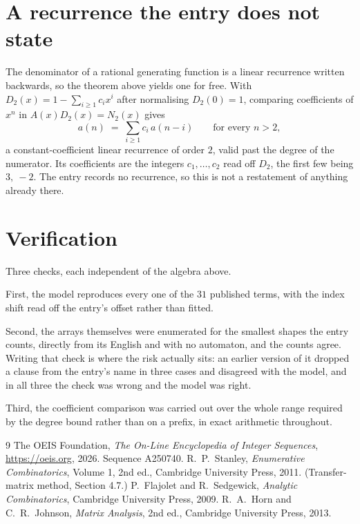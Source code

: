 \documentclass[11pt,a4paper]{article}
\theoremstyle{plain}
\theoremstyle{definition}
\begin{document}
\section{A recurrence the entry does not state}

The denominator of a rational generating function is a linear recurrence written backwards, so
the theorem above yields one for free. With $D_2(x)=1-\sum_{i\ge1}c_ix^i$ after normalising
$D_2(0)=1$, comparing coefficients of $x^n$ in $A(x)D_2(x)=N_2(x)$ gives
\[
a(n)\;=\;\sum_{i\ge1}c_i\,a(n-i)\qquad\text{for every }n>2,
\]
a constant-coefficient linear recurrence of order $2$, valid past the degree of the
numerator. Its coefficients are the integers $c_1,\dots,c_{2}$ read off $D_2$, the first few being $3,\ -2$. The entry records no recurrence, so this is not a restatement of anything
already there.

\section{Verification}

Three checks, each independent of the algebra above.

First, the model reproduces every one of the $31$ published terms, with the index shift
read off the entry's offset rather than fitted.

Second, the arrays themselves were enumerated for the smallest shapes the entry counts,
directly from its English and with no automaton, and the counts agree. Writing that check is
where the risk actually sits: an earlier version of it dropped a clause from the entry's name
in three cases and disagreed with the model, and in all three the check was wrong and the model
was right.

Third, the coefficient comparison was carried out over the whole range required by the degree
bound rather than on a prefix, in exact arithmetic throughout.

\begin{thebibliography}{9}
 The OEIS Foundation, \emph{The On-Line Encyclopedia of Integer
Sequences}, \url{https://oeis.org}, 2026. Sequence A250740.
 R.~P.~Stanley, \emph{Enumerative Combinatorics}, Volume 1, 2nd ed.,
Cambridge University Press, 2011. (Transfer-matrix method, Section 4.7.)
 P.~Flajolet and R.~Sedgewick, \emph{Analytic Combinatorics}, Cambridge
University Press, 2009.
 R.~A.~Horn and C.~R.~Johnson, \emph{Matrix Analysis}, 2nd ed., Cambridge
University Press, 2013.
\end{thebibliography}
\end{document}
